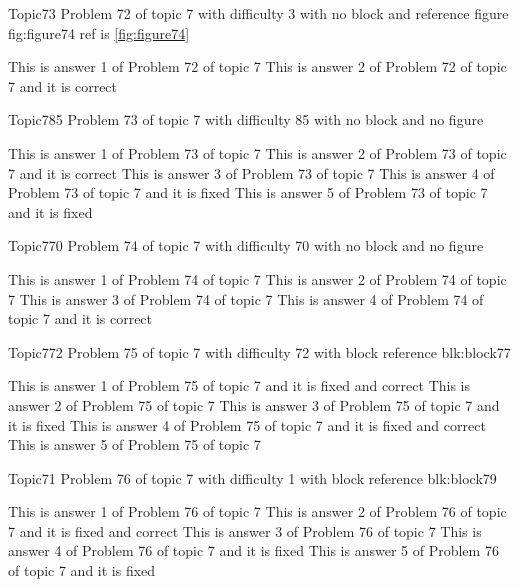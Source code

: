 \documentclass[master]{exam}
\begin{document}
\begin{problem}{Topic7}{3}
	Problem 72 of topic 7 with difficulty 3 with no block and reference figure fig:figure74 ref is \ref{fig:figure74}
	\begin{answers}
		\answer This is answer 1 of Problem 72 of topic 7 
		\answer[correct] This is answer 2 of Problem 72 of topic 7 and it is correct
	\end{answers}
\end{problem}

\begin{problem}{Topic7}{85}
	Problem 73 of topic 7 with difficulty 85 with no block and no figure
	\begin{answers}
		\answer This is answer 1 of Problem 73 of topic 7 
		\answer[correct] This is answer 2 of Problem 73 of topic 7 and it is correct
		\answer This is answer 3 of Problem 73 of topic 7 
		\answer[fixed] This is answer 4 of Problem 73 of topic 7 and it is fixed
		\answer[fixed] This is answer 5 of Problem 73 of topic 7 and it is fixed
	\end{answers}
\end{problem}

\begin{problem}{Topic7}{70}
	Problem 74 of topic 7 with difficulty 70 with no block and no figure
	\begin{answers}
		\answer This is answer 1 of Problem 74 of topic 7 
		\answer This is answer 2 of Problem 74 of topic 7 
		\answer This is answer 3 of Problem 74 of topic 7 
		\answer[correct] This is answer 4 of Problem 74 of topic 7 and it is correct
	\end{answers}
\end{problem}

\begin{problem}[requires=blk:block77]{Topic7}{72}
	Problem 75 of topic 7 with difficulty 72 with block reference blk:block77
	\begin{answers}
		 This is answer 1 of Problem 75 of topic 7 and it is fixed and correct
		\answer This is answer 2 of Problem 75 of topic 7 
		\answer[fixed] This is answer 3 of Problem 75 of topic 7 and it is fixed
		 This is answer 4 of Problem 75 of topic 7 and it is fixed and correct
		\answer This is answer 5 of Problem 75 of topic 7 
	\end{answers}
\end{problem}

\begin{problem}[requires=blk:block79]{Topic7}{1}
	Problem 76 of topic 7 with difficulty 1 with block reference blk:block79
	\begin{answers}
		\answer This is answer 1 of Problem 76 of topic 7 
		 This is answer 2 of Problem 76 of topic 7 and it is fixed and correct
		\answer This is answer 3 of Problem 76 of topic 7 
		\answer[fixed] This is answer 4 of Problem 76 of topic 7 and it is fixed
		\answer[fixed] This is answer 5 of Problem 76 of topic 7 and it is fixed
	\end{answers}
\end{problem}
\end{document}
